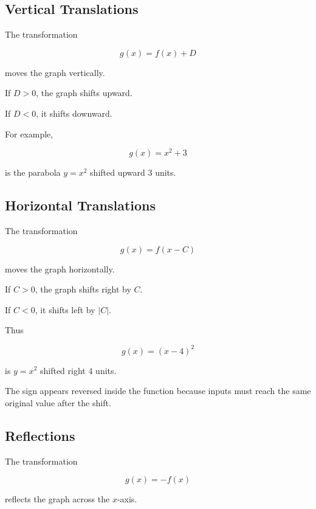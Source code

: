 \subsection{Vertical Translations}
\label{subsec:vertical-translations}

The transformation

\[ g(x)=f(x)+D \]

moves the graph vertically.

If \(D>0\), the graph shifts upward.

If \(D<0\), it shifts downward.

For example,

\[ g(x)=x^2+3 \]

is the parabola \(y=x^2\) shifted upward \(3\) units.

\subsection{Horizontal Translations}
\label{subsec:horizontal-translations}

The transformation

\[ g(x)=f(x-C) \]

moves the graph horizontally.

If \(C>0\), the graph shifts right by \(C\).

If \(C<0\), it shifts left by \(|C|\).

Thus

\[ g(x)=(x-4)^2 \]

is \(y=x^2\) shifted right \(4\) units.

The sign appears reversed inside the function because inputs must reach the
same original value after the shift.

\subsection{Reflections}
\label{subsec:function-reflections}

The transformation

\[ g(x)=-f(x) \]

reflects the graph across the \(x\)-axis.

